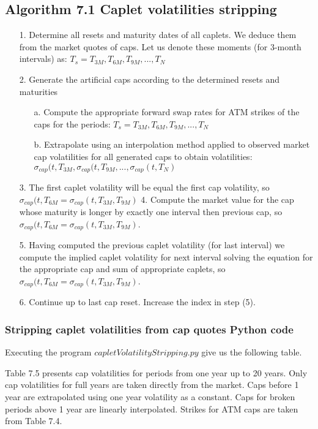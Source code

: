 \documentclass[11pt]{article}
\numberwithin{equation}{subsection}
\begin{document}
\subsection*{Algorithm 7.1 Caplet volatilities stripping}

\begin{enumerate}
	\item [1.] Determine all resets and maturity dates of all caplets. We deduce them from the market
	quotes of caps. Let us denote these moments (for 3-month intervals) as: 
	\(T_s=T_{3M}, T_{6M}, T_{9M}, ...,T_{N}\)
	\item [2.] Generate the artificial caps according to the determined resets and maturities
	\begin{enumerate}
		\item [a.] Compute the appropriate forward swap rates for ATM strikes of the caps for the
		periods: \(T_s=T_{3M}, T_{6M}, T_{9M}, ...,T_{N}\)
		\item [b.] Extrapolate using an interpolation method applied to observed market
		cap volatilities for all generated caps to obtain volatilities:
		\(\sigma_{cap}(t, T_{3M}, \sigma_{cap}(t, T_{9M},..., \sigma_{cap}(t, T_{N})\)
	\end{enumerate}
	\item [3.] The first caplet volatility will be equal the first cap volatility, so \(\sigma_{cap}(t, T_{6M} = \sigma_{cap}(t, T_{3M}, T_{9M})\)
	4. Compute the market value for the cap whose maturity is longer by exactly one interval
	then previous cap, so \(\sigma_{cap}(t, T_{6M} = \sigma_{cap}(t, T_{3M}, T_{9M})\).
	\item [5.] Having computed the previous caplet volatility (for last interval) we compute the implied
	caplet volatility for next interval solving the equation for the appropriate cap and sum of
	appropriate caplets, so \(\sigma_{cap}(t, T_{6M} = \sigma_{cap}(t, T_{3M}, T_{9M})\).
	\item [6.] Continue up to last cap reset. Increase the index in step (5).
\end{enumerate}

\subsubsection{Stripping caplet volatilities from cap quotes Python code}
Executing the program \(capletVolatilityStripping.py\) give us the following table. 

Table 7.5 presents cap volatilities for periods from one year up to 20 years. Only cap volatilities
for full years are taken directly from the market. Caps before 1 year are extrapolated
using one year volatility as a constant. Caps for broken periods above 1 year are linearly
interpolated. Strikes for ATM caps are taken from Table 7.4.
\end{document}
